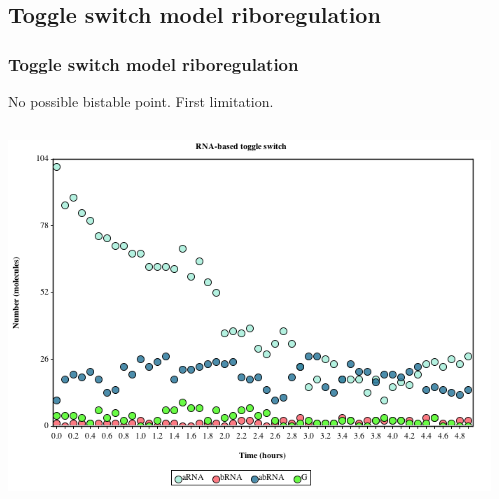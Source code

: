 \documentclass{beamer}
\begin{document}
\subsection{Toggle switch model riboregulation}
\begin{frame}
  \frametitle{Toggle switch model riboregulation}

No possible bistable point. First limitation.

\begin{columns}[T]
    \begin{column}{0.5\textwidth}
      \centering
       \includegraphics[scale=0.3]{RNA_based_toggle_timecourse.png}
    \end{column}
    \begin{column}{0.5\textwidth}
      \centering
    \end{column}
  \end{columns}
\end{frame}

\end{document}
